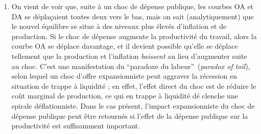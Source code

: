 \documentclass[11pt,a4paper]{article}
\begin{document}
\begin{enumerate}
\item On vient de voir que, suite \`{a} un choc de d\'{e}pense publique, les
courbes OA et DA se d\'{e}pla\c{c}aient toutes deux vers le bas, mais on
sait (analytiquement) que le nouvel \'{e}quilibre se situe \`{a} des niveaux
plus \'{e}lev\'{e}s d'inflation et de production. Si le choc de d\'{e}pense
augmente la productivit\'{e} du travail, alors la courbe OA se d\'{e}place
davantage, et il devient possible qu'elle se d\'{e}place tellement que la
production et l'inflation \textit{baissent} au lieu d'augmenter suite au
choc. C'est une manifestation du \textquotedblleft paradoxe du
labeur\textquotedblright\ (\textit{paradox of toil}), selon lequel un choc
d'offre expansionniste peut aggraver la r\'{e}cession en situation de trappe 
\`{a} liquidit\'{e} ; en effet, l'effet direct du choc est de r\'{e}duire le
co\^{u}t marginal de production, ce qui en trappe \`{a} liquidit\'{e} d\'{e}%
clenche une spirale d\'{e}flationniste. Dans le cas pr\'{e}sent, l'impact
expansionniste du choc de d\'{e}pense publique peut \^{e}tre retourn\'{e}s
si l'effet de la d\'{e}pense publique sur la productivit\'{e} est
suffisamment important.
\end{enumerate}
\end{document}
